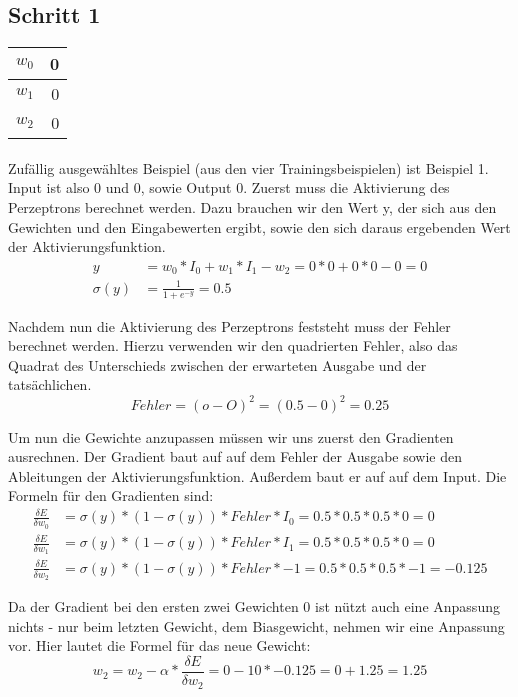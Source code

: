 \documentclass[a4paper]{article}
\begin{document}
\subsection{Schritt 1}
\begin{tabular}{|l|r|}
	\hline
	$w_0$ & 0 \\\hline
	$w_1$ & 0 \\\hline
	$w_2$ & 0 \\\hline
\end{tabular}
\paragraph{}
Zufällig ausgewähltes Beispiel (aus den vier Trainingsbeispielen) ist Beispiel 1. Input ist also 0 und 0, sowie Output 0.
Zuerst muss die Aktivierung des Perzeptrons berechnet werden. Dazu brauchen wir den Wert y, der sich aus den Gewichten und den Eingabewerten ergibt, sowie den sich daraus ergebenden Wert der Aktivierungsfunktion.
\begin{align*}
	y &= w_0 * I_0 + w_1 * I_1 - w_2 = 0 * 0 + 0 * 0 - 0 = 0 \\
	\sigma(y) &= \frac{1}{1 + e^{-y}} = 0.5
\end{align*}

Nachdem nun die Aktivierung des Perzeptrons feststeht muss der Fehler berechnet werden. Hierzu verwenden wir den quadrierten Fehler, also das Quadrat des Unterschieds zwischen der erwarteten Ausgabe und der tatsächlichen.
\[
	Fehler = (o - O)^2 = (0.5 - 0)^2 = 0.25
\]

Um nun die Gewichte anzupassen müssen wir uns zuerst den Gradienten ausrechnen.
Der Gradient baut auf auf dem Fehler der Ausgabe sowie den Ableitungen der Aktivierungsfunktion. Außerdem baut er auf auf dem Input. Die Formeln für den Gradienten sind:
\begin{align*}
	\frac{\delta E}{\delta w_0} &= \sigma(y) * (1 - \sigma(y)) * Fehler * I_0 = 0.5 * 0.5 * 0.5 * 0 = 0 \\
	\frac{\delta E}{\delta w_1} &= \sigma(y) * (1 - \sigma(y)) * Fehler * I_1 = 0.5 * 0.5 * 0.5 * 0 = 0 \\
	\frac{\delta E}{\delta w_2} &= \sigma(y) * (1 - \sigma(y)) * Fehler * -1 = 0.5 * 0.5 * 0.5 * -1 = -0.125
\end{align*}

Da der Gradient bei den ersten zwei Gewichten 0 ist nützt auch eine Anpassung nichts - nur beim letzten Gewicht, dem Biasgewicht, nehmen wir eine Anpassung vor. Hier lautet die Formel für das neue Gewicht:
\[
	w_2 = w_2 - \alpha * \frac{\delta E}{\delta w_2} = 0 - 10 * -0.125 = 0 + 1.25 = 1.25
\]
\end{document}
